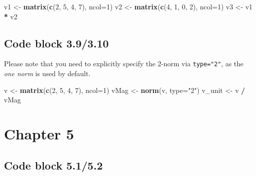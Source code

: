 \documentclass[
]{book}
\newenvironment{Shaded}{\begin{snugshade}}{\end{snugshade}}
\newcommand{\DataTypeTok}[1]{\textcolor[rgb]{0.13,0.29,0.53}{#1}}
\newcommand{\DecValTok}[1]{\textcolor[rgb]{0.00,0.00,0.81}{#1}}
\newcommand{\KeywordTok}[1]{\textcolor[rgb]{0.13,0.29,0.53}{\textbf{#1}}}
\newcommand{\NormalTok}[1]{#1}
\newcommand{\OperatorTok}[1]{\textcolor[rgb]{0.81,0.36,0.00}{\textbf{#1}}}
\newcommand{\StringTok}[1]{\textcolor[rgb]{0.31,0.60,0.02}{#1}}
\begin{document}
\begin{Shaded}
\begin{Highlighting}[]
\NormalTok{v1 \textless{}{-}}\StringTok{ }\KeywordTok{matrix}\NormalTok{(}\KeywordTok{c}\NormalTok{(}\DecValTok{2}\NormalTok{, }\DecValTok{5}\NormalTok{, }\DecValTok{4}\NormalTok{, }\DecValTok{7}\NormalTok{), }\DataTypeTok{ncol=}\DecValTok{1}\NormalTok{)}
\NormalTok{v2 \textless{}{-}}\StringTok{ }\KeywordTok{matrix}\NormalTok{(}\KeywordTok{c}\NormalTok{(}\DecValTok{4}\NormalTok{, }\DecValTok{1}\NormalTok{, }\DecValTok{0}\NormalTok{, }\DecValTok{2}\NormalTok{), }\DataTypeTok{ncol=}\DecValTok{1}\NormalTok{)}
\NormalTok{v3 \textless{}{-}}\StringTok{ }\NormalTok{v1 }\OperatorTok{*}\StringTok{ }\NormalTok{v2}
\end{Highlighting}
\end{Shaded}

\hypertarget{code-block-3.93.10}{%
\subsection*{Code block 3.9/3.10}\label{code-block-3.93.10}}

Please note that you need to explicitly specify the 2-norm via \texttt{type="2"}, as the \emph{one norm} is used by default.

\begin{Shaded}
\begin{Highlighting}[]
\NormalTok{v \textless{}{-}}\StringTok{ }\KeywordTok{matrix}\NormalTok{(}\KeywordTok{c}\NormalTok{(}\DecValTok{2}\NormalTok{, }\DecValTok{5}\NormalTok{, }\DecValTok{4}\NormalTok{, }\DecValTok{7}\NormalTok{), }\DataTypeTok{ncol=}\DecValTok{1}\NormalTok{)}
\NormalTok{vMag \textless{}{-}}\StringTok{ }\KeywordTok{norm}\NormalTok{(v, }\DataTypeTok{type=}\StringTok{"2"}\NormalTok{)}
\NormalTok{v\_unit \textless{}{-}}\StringTok{ }\NormalTok{v }\OperatorTok{/}\StringTok{ }\NormalTok{vMag}
\end{Highlighting}
\end{Shaded}

\hypertarget{chapter-5}{%
\section*{Chapter 5}\label{chapter-5}}

\hypertarget{code-block-5.15.2}{%
\subsection*{Code block 5.1/5.2}\label{code-block-5.15.2}}
\end{document}

